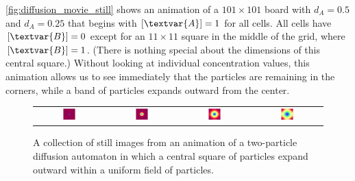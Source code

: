 \autoref{fig:diffusion_movie_still} shows an animation of a $101 \times 101$ board with $d_A = 0.5$ and $d_A = 0.25$ that begins with $[\textvar{A}] = 1$ for all cells. All cells have $[\textvar{B}] = 0$ except for an $11 \times 11$ square in the middle of the grid, where $[\textvar{B}] = 1$. (There is nothing special about the dimensions of this central square.) Without looking at individual concentration values, this animation allows us to see immediately that the  particles are remaining in the corners, while a band of  particles expands outward from the center.\\

\begin{note}\end{note}

\begin{figure}[h]
\centering
\mySfFamily
\begin{tabular}{c c c c}
\includegraphics[width = 0.19\textwidth]{../images_CMYK/diffusion__Moment_1} & \includegraphics[width = 0.19\textwidth]{../images_CMYK/diffusion__Moment_2} &
\includegraphics[width = 0.19\textwidth]{../images_CMYK/diffusion__Moment_3} & \includegraphics[width = 0.19\textwidth]{../images_CMYK/diffusion__Moment_4}
\end{tabular}
\caption{A collection of still images from an animation of a two-particle diffusion automaton in which a central square of  particles expand outward within a uniform field of  particles.}
\label{fig:diffusion_movie_still}
\end{figure}

